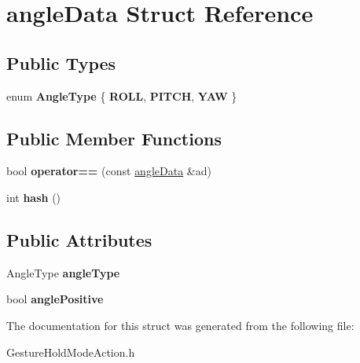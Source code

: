 \hypertarget{structangle_data}{\section{angle\+Data Struct Reference}
\label{structangle_data}
}
\subsection*{Public Types}
\begin{DoxyCompactItemize}
\item 
\hypertarget{structangle_data_a472cedff410d7030ee7d2a9717269605}{enum {\bfseries Angle\+Type} \{ {\bfseries R\+O\+L\+L}, 
{\bfseries P\+I\+T\+C\+H}, 
{\bfseries Y\+A\+W}
 \}}\label{structangle_data_a472cedff410d7030ee7d2a9717269605}

\end{DoxyCompactItemize}
\subsection*{Public Member Functions}
\begin{DoxyCompactItemize}
\item 
\hypertarget{structangle_data_a57adb22d4f23592ca12bf8d589c6c115}{bool {\bfseries operator==} (const \hyperlink{structangle_data}{angle\+Data} \&ad)}\label{structangle_data_a57adb22d4f23592ca12bf8d589c6c115}

\item 
\hypertarget{structangle_data_ac6bfd871a3cf570af219a54ac255a6f6}{int {\bfseries hash} ()}\label{structangle_data_ac6bfd871a3cf570af219a54ac255a6f6}

\end{DoxyCompactItemize}
\subsection*{Public Attributes}
\begin{DoxyCompactItemize}
\item 
\hypertarget{structangle_data_a0667820205af53b2675bc72add354f4e}{Angle\+Type {\bfseries angle\+Type}}\label{structangle_data_a0667820205af53b2675bc72add354f4e}

\item 
\hypertarget{structangle_data_a5a5348d1029b321daa1103d0567e125d}{bool {\bfseries angle\+Positive}}\label{structangle_data_a5a5348d1029b321daa1103d0567e125d}

\end{DoxyCompactItemize}


The documentation for this struct was generated from the following file\+:\begin{DoxyCompactItemize}
\item 
Gesture\+Hold\+Mode\+Action.\+h\end{DoxyCompactItemize}
